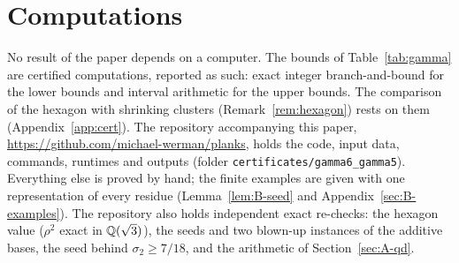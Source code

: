 \documentclass[11pt]{article}
\begin{document}
\section*{Computations}

No result of the paper depends on a computer. The bounds of Table~\ref{tab:gamma} are certified computations,
reported as such: exact integer branch-and-bound for the lower bounds and interval arithmetic for the upper bounds.
The comparison of the hexagon with shrinking clusters (Remark~\ref{rem:hexagon}) rests on them
(Appendix~\ref{app:cert}). The repository
accompanying this paper, \url{https://github.com/michael-werman/planks}, holds the code, input data,
commands, runtimes and outputs (folder \texttt{certificates/\allowbreak gamma6\_\allowbreak gamma5}).
Everything else is proved by hand; the finite examples are given with one representation of every
residue (Lemma~\ref{lem:B-seed} and Appendix~\ref{sec:B-examples}). The repository also holds
independent exact re-checks: the hexagon value ($\rho^2$ exact in $\mathbb{Q}(\sqrt3)$), the seeds and two
blown-up instances of the additive bases, the seed behind $\sigma_2\ge7/18$, and the arithmetic of
Section~\ref{sec:A-qd}.
\end{document}
